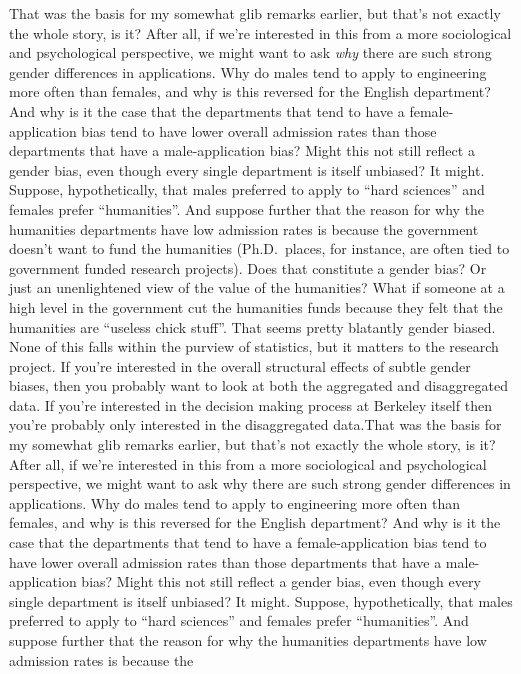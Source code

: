 \documentclass[
  letterpaper,
]{book}
\begin{document}
That was the basis for my somewhat glib remarks earlier, but that's not
exactly the whole story, is it? After all, if we're interested in this
from a more sociological and psychological perspective, we might want to
ask \emph{why} there are such strong gender differences in applications.
Why do males tend to apply to engineering more often than females, and
why is this reversed for the English department? And why is it the case
that the departments that tend to have a female-application bias tend to
have lower overall admission rates than those departments that have a
male-application bias? Might this not still reflect a gender bias, even
though every single department is itself unbiased? It might. Suppose,
hypothetically, that males preferred to apply to ``hard sciences'' and
females prefer ``humanities''. And suppose further that the reason for
why the humanities departments have low admission rates is because the
government doesn't want to fund the humanities (Ph.D.~places, for
instance, are often tied to government funded research projects). Does
that constitute a gender bias? Or just an unenlightened view of the
value of the humanities? What if someone at a high level in the
government cut the humanities funds because they felt that the
humanities are ``useless chick stuff''. That seems pretty blatantly
gender biased. None of this falls within the purview of statistics, but
it matters to the research project. If you're interested in the overall
structural effects of subtle gender biases, then you probably want to
look at both the aggregated and disaggregated data. If you're interested
in the decision making process at Berkeley itself then you're probably
only interested in the disaggregated data.That was the basis for my
somewhat glib remarks earlier, but that's not exactly the whole story,
is it? After all, if we're interested in this from a more sociological
and psychological perspective, we might want to ask why there are such
strong gender differences in applications. Why do males tend to apply to
engineering more often than females, and why is this reversed for the
English department? And why is it the case that the departments that
tend to have a female-application bias tend to have lower overall
admission rates than those departments that have a male-application
bias? Might this not still reflect a gender bias, even though every
single department is itself unbiased? It might. Suppose, hypothetically,
that males preferred to apply to ``hard sciences'' and females prefer
``humanities''. And suppose further that the reason for why the
humanities departments have low admission rates is because the
\end{document}
